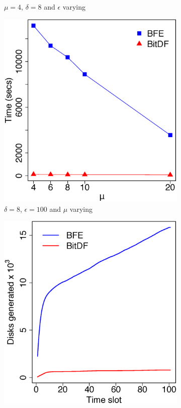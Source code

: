 \begin{figure}
\begin{subfigure}[t]{0.48\textwidth}
        \caption{$\mu = 4$, $\delta = 8$ and $\epsilon$ varying}
        \label{fig:brinkhoff_vary_g}
    \end{subfigure}
    \begin{subfigure}[t]{0.48\textwidth}
        \includegraphics[width=\textwidth]{images/Brinkhoff_l_8_g_200_varying_n.eps}
        \caption{$\delta = 8$, $\epsilon = 100$ and $\mu$ varying}
        \label{fig:brinkhoff_vary_n}
    \end{subfigure}
    \begin{subfigure}[t]{0.48\textwidth}
        \includegraphics[width=\textwidth]{images/Brinkhoff_d.eps}

\end{subfigure}
\end{figure}
